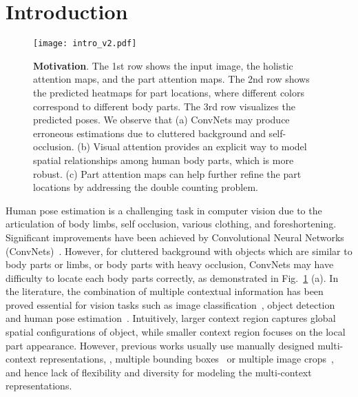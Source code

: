 \documentclass[10pt,twocolumn,letterpaper]{article}
\begin{document}
\vspace{-1em}
\section{Introduction}

\begin{figure}
	\begin{center}
	\texttt{[image: intro\_v2.pdf]}
	\end{center}
	\vspace{-1em}
	\caption{\small \textbf{Motivation}. The 1st row shows the input image, the holistic attention maps, and the part attention maps. The 2nd row shows the predicted heatmaps for part locations, where different colors correspond to different body parts. 
	The 3rd row visualizes the predicted poses. 
	We observe that (a) ConvNets may produce erroneous estimations due to cluttered background and self-occlusion. 
	(b) Visual attention provides an explicit way to model spatial relationships among human body parts, which is more robust. 
	(c) Part attention maps can help further refine the part locations by addressing the double counting problem. }
	\label{fig:motivation}
	\vspace{-1.5em}
\end{figure}

Human pose estimation is a challenging task in computer vision due to the articulation of body limbs, self occlusion, various clothing, and foreshortening. 
Significant improvements have been achieved by Convolutional Neural Networks (ConvNets)~\cite{tompson2014joint,toshev2014deeppose,chu2016structure,wei2016convolutional,tompson2015efficient,newell2016stacked}. 
However, for cluttered background with objects which are similar to body parts or limbs, or body parts with heavy occlusion, ConvNets may have difficulty to locate each body parts correctly, as demonstrated in Fig.~\ref{fig:motivation} (a). 
In the literature, the combination of multiple contextual information has been proved essential for vision tasks such as image classification~\cite{krizhevsky2012imagenet}, object  detection~\cite{girshick2014deformable,gidaris2015object,xyzeng2016object} and human pose estimation~\cite{ramakrishna2014pose, tompson2015efficient}. 
Intuitively, larger context region captures global spatial configurations of object, while smaller context region focuses on the local part appearance. 
However, previous works usually use manually designed multi-context representations, \eg, multiple bounding boxes~\cite{ramakrishna2014pose} or multiple image crops~\cite{krizhevsky2012imagenet}, and hence lack of flexibility and diversity for modeling the multi-context representations.
\end{document}
